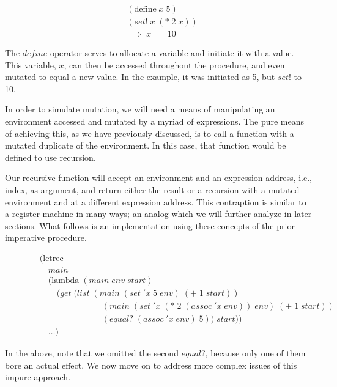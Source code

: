 \begin{figure}[ht]
\caption{}\label{scheme}
\begin{align*}
& (\text{define} \; x \; 5)
\\& (set! \; x \; (* \; 2 \; x))
\\& \implies \; x \; = \; 10
\end{align*}
\end{figure}

The $define$ operator serves to allocate a variable and initiate it with a value. 
This variable, $x$, can then be accessed throughout the procedure, and even mutated 
to equal a new value. In the example, it was initiated as 5, but $set!$ to 10.

In order to simulate mutation, we will need a means of manipulating an environment
accessed and mutated by a myriad of expressions. The pure means of achieving this,
as we have previously discussed, is to call a function with a mutated duplicate of
the environment. In this case, that function would be defined to use recursion.

Our recursive function will accept an environment and an expression address, i.e.,
index, as argument, and return either the result or a recursion with a mutated
environment and at a different expression address. This contraption is similar to 
a register machine in many ways; an analog which we will further analyze in later
sections. What follows is an implementation using these concepts of the prior
imperative procedure.

\begin{figure}[ht]
\caption{}\label{scheme}
\begin{align*}
& (\text{letrec} \; 
\\& \quad main \; 
\\& \quad (\text{lambda} \; (main \; env \; start)
\\& \qquad (get \; (list \; (main \; (set \; 'x \; 5 \; env) \; (+ \; 1 \; start))
\\& \qquad \qquad \qquad \quad \; (main \; (set \; 'x \; (* \; 2 \; (assoc \; 'x \; env)) \; env) \; (+ \; 1 \; start))
\\& \qquad \qquad \qquad \quad \; (equal? \; (assoc \; 'x \; env) \; 5)) \; start))
\\& \quad \dots)
\end{align*}
\end{figure}

In the above, note that we omitted the second $equal?$, because only one of them bore
an actual effect. We now move on to address more complex issues of this impure 
approach.


